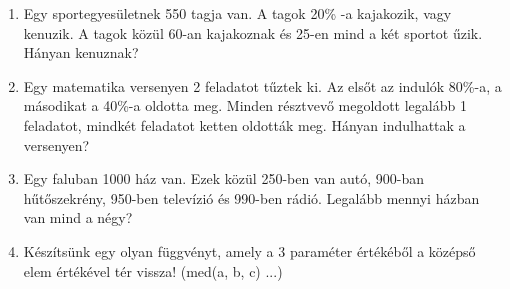 \documentclass[a4paper]{article}
\newenvironment{solution}
{\color{RoyalBlue}}{\bigskip}
\begin{document}
\begin{enumerate}
Mivel egyenlő az $A \bigtriangleup B \bigtriangleup C$ kifejezés?

\begin{solution}
Előtte be kell látni, hogy kommutatív a kifejezés!
\end{solution}

\item

Egy sportegyesületnek 550 tagja van. A tagok 20\% -a kajakozik, vagy kenuzik. A tagok közül 60-an kajakoznak és 25-en mind a két sportot űzik. Hányan kenuznak?

\item

Egy matematika versenyen 2 feladatot tűztek ki. Az elsőt az indulók 80\%-a, a másodikat a 40\%-a oldotta meg. Minden résztvevő megoldott legalább 1 feladatot, mindkét feladatot ketten oldották meg. Hányan indulhattak a versenyen?

\item

Egy faluban 1000 ház van. Ezek közül 250-ben van autó, 900-ban hűtőszekrény, 950-ben televízió és 990-ben rádió. Legalább mennyi házban van mind a négy?

\item

Készítsünk egy olyan függvényt, amely a 3 paraméter értékéből a középső elem értékével tér vissza! (med(a, b, c) ...)

\end{enumerate}
\end{document}
